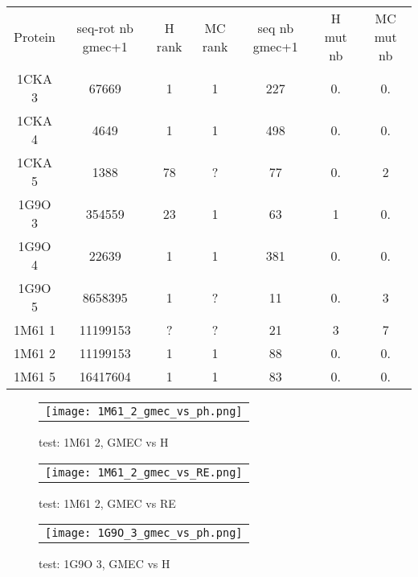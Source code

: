     \begin{table}[h]
      \centering

      \begin{tabular}{ccccccc}


        \toprule
        Protein & seq-rot nb gmec+1 & H rank  & MC rank  & seq nb gmec+1 & H mut nb & MC mut nb \\
        \cmidrule{1-7}
        1CKA 3 & 67669 & 1 & 1 & 227 & 0. & 0. \\
        1CKA 4 & 4649 & 1 & 1 & 498 & 0. & 0. \\
        1CKA 5 & 1388 & 78 & ? & 77 & 0. & 2 \\
        1G9O 3 & 354559 & 23 & 1 & 63 & 1 & 0. \\
        1G9O 4 & 22639 & 1 & 1 & 381 & 0. & 0. \\
        1G9O 5 & 8658395 & 1 & ? &  11 & 0. & 3 \\
        1M61 1 & 11199153 & ? & ? & 21 & 3 & 7 \\
        1M61 2 & 11199153 & 1 & 1 & 88 & 0. & 0. \\
        1M61 5 & 16417604 & 1 & 1 & 83 & 0. & 0. \\
        \bottomrule
      \end{tabular} 
\label{tab:etude_au_voisinnage}           
\end{table}


    \clearpage
    
    \begin{figure}[h]
      \centering
      \begin{tabular}{c} 
        \texttt{[image: 1M61\_2\_gmec\_vs\_ph.png]} 
      \end{tabular}
      
      \caption{test: 1M61 2, GMEC vs H}
\label{image:1M61_2_GMEC_vs_H}
    \end{figure}
    
        
    \begin{figure}[h]
      \centering
      \begin{tabular}{c} 
        \texttt{[image: 1M61\_2\_gmec\_vs\_RE.png]} 
      \end{tabular}
      
      \caption{test: 1M61 2, GMEC vs RE}
\label{image:1M61_2_GMEC_vs_RE}
    \end{figure}
    
        
    \begin{figure}[h]
      \centering
      \begin{tabular}{c} 
        \texttt{[image: 1G9O\_3\_gmec\_vs\_ph.png]} 
      \end{tabular}
      
      \caption{test: 1G9O 3, GMEC vs H}
\label{image:1G9O_3_GMEC_vs_H}
    \end{figure}
    
